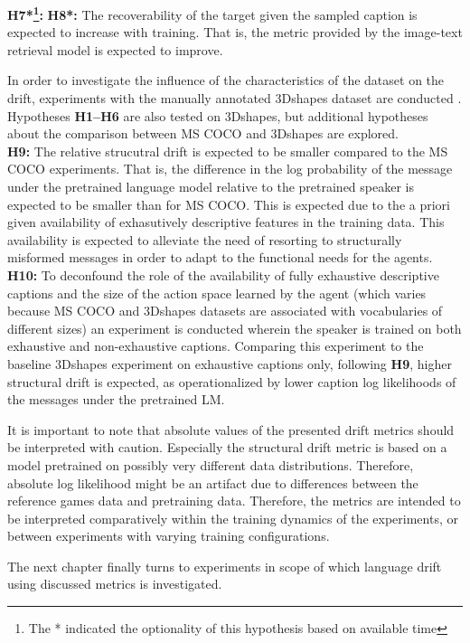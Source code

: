 \textbf{H7*\footnote{The * indicated the optionality of this hypothesis based on available time}:}  \newline
\textbf{H8*:} The recoverability of the target given the sampled caption is expected to increase with training. That is, the metric provided by the image-text retrieval model is expected to improve. \newline

In order to investigate the influence of the characteristics of the dataset on the drift, experiments with the manually annotated 3Dshapes dataset are conducted \parencite{burgess20183d}. Hypotheses \textbf{H1--H6} are also tested on 3Dshapes, but additional hypotheses about the comparison between MS COCO and 3Dshapes are explored. \\
\newline
\textbf{H9:} The relative strucutral drift is expected to be smaller compared to the MS COCO experiments. That is, the difference in the log probability of the message under the pretrained language model relative to the pretrained speaker is expected to be smaller than for MS COCO. This is expected due to the a priori given availability of exhasutively descriptive features in the training data. This availability is expected to alleviate the need of resorting to structurally misformed messages in order to adapt to the functional needs for the agents. \newline
\textbf{H10:} To deconfound the role of the availability of fully exhaustive descriptive captions and the size of the action space learned by the agent (which varies because MS COCO and 3Dshapes datasets are associated with vocabularies of different sizes) an experiment is conducted wherein the speaker is trained on both exhaustive and non-exhaustive captions. Comparing this experiment to the baseline 3Dshapes experiment on exhaustive captions only, following \textbf{H9}, higher structural drift is expected, as operationalized by lower caption log likelihoods of the messages under the pretrained LM.\newline

It is important to note that absolute values of the presented drift metrics should be interpreted with caution. Especially the structural drift metric is based on a model pretrained on possibly very different data distributions. Therefore, absolute log likelihood might be an artifact due to differences between the reference games data and pretraining data. Therefore, the metrics are intended to be interpreted comparatively within the training dynamics of the experiments, or between experiments with varying training configurations.

The next chapter finally turns to experiments in scope of which language drift using discussed metrics is investigated. 